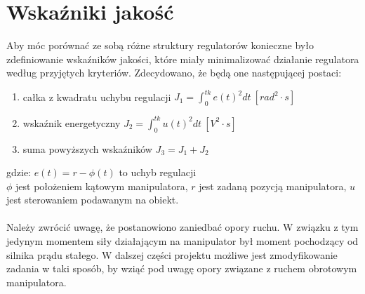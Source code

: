 \section{Wska\'zniki jakość}
Aby móc porównać ze sobą różne struktury regulatorów  konieczne było zdefiniowanie wska\'zników jakości, które miały minimalizować działanie regulatora według przyjętych kryteriów. Zdecydowano, że będą one następującej postaci:
\begin{enumerate}
	\item całka z kwadratu uchybu regulacji $J_1 = \int_{0}^{tk}e(t)^2 dt \  [rad^2 \cdot s]$
	\item  wska\'znik energetyczny $J_2 = \int_{0}^{tk}u(t)^2 dt \ [V^2 \cdot s]$
	\item  suma powyższych wska\'zników $J_3 = J_1 + J _2$
\end{enumerate}
\begin{equation}
\end{equation}
\noindent gdzie:\newline
$e(t) = r - \phi(t)$ to uchyb regulacji\\
\(\phi\) jest położeniem kątowym manipulatora,\newline
\(r\) jest zadaną pozycją manipulatora,\newline
\(u\) jest sterowaniem podawanym na obiekt.

\paragraph*{}
Należy zwrócić uwagę, że postanowiono zaniedbać opory ruchu. W związku z tym jedynym momentem siły działającym na manipulator był moment pochodzący od silnika prądu stałego. W dalszej części projektu możliwe jest zmodyfikowanie zadania w taki sposób, by wziąć pod uwagę opory związane z ruchem obrotowym manipulatora.